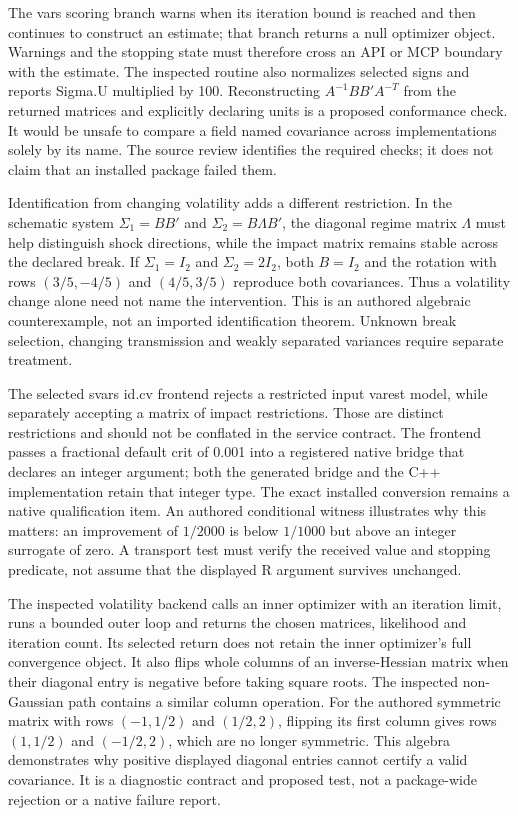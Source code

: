 The vars scoring branch warns when its iteration bound is reached and then continues to construct an estimate; that branch returns a null optimizer object. Warnings and the stopping state must therefore cross an API or MCP boundary with the estimate. The inspected routine also normalizes selected signs and reports Sigma.U multiplied by 100. Reconstructing $A^{-1}BB'A^{-T}$ from the returned matrices and explicitly declaring units is a proposed conformance check. It would be unsafe to compare a field named covariance across implementations solely by its name. The source review identifies the required checks; it does not claim that an installed package failed them.\citep{exec25_rdyn_vars}

Identification from changing volatility adds a different restriction. In the schematic system $\Sigma_1=BB'$ and $\Sigma_2=B\Lambda B'$, the diagonal regime matrix $\Lambda$ must help distinguish shock directions, while the impact matrix remains stable across the declared break. If $\Sigma_1=I_2$ and $\Sigma_2=2I_2$, both $B=I_2$ and the rotation with rows $(3/5,-4/5)$ and $(4/5,3/5)$ reproduce both covariances. Thus a volatility change alone need not name the intervention. This is an authored algebraic counterexample, not an imported identification theorem. Unknown break selection, changing transmission and weakly separated variances require separate treatment.\citep{exec25_rdyn_choice}

The selected svars id.cv frontend rejects a restricted input varest model, while separately accepting a matrix of impact restrictions. Those are distinct restrictions and should not be conflated in the service contract. The frontend passes a fractional default crit of 0.001 into a registered native bridge that declares an integer argument; both the generated bridge and the C++ implementation retain that integer type. The exact installed conversion remains a native qualification item. An authored conditional witness illustrates why this matters: an improvement of $1/2000$ is below $1/1000$ but above an integer surrogate of zero. A transport test must verify the received value and stopping predicate, not assume that the displayed R argument survives unchanged.\citep{exec25_rdyn_svars,exec25_rdyn_choice}

The inspected volatility backend calls an inner optimizer with an iteration limit, runs a bounded outer loop and returns the chosen matrices, likelihood and iteration count. Its selected return does not retain the inner optimizer's full convergence object. It also flips whole columns of an inverse-Hessian matrix when their diagonal entry is negative before taking square roots. The inspected non-Gaussian path contains a similar column operation. For the authored symmetric matrix with rows $(-1,1/2)$ and $(1/2,2)$, flipping its first column gives rows $(1,1/2)$ and $(-1/2,2)$, which are no longer symmetric. This algebra demonstrates why positive displayed diagonal entries cannot certify a valid covariance. It is a diagnostic contract and proposed test, not a package-wide rejection or a native failure report.\citep{exec25_rdyn_svars,exec25_rdyn_choice}

